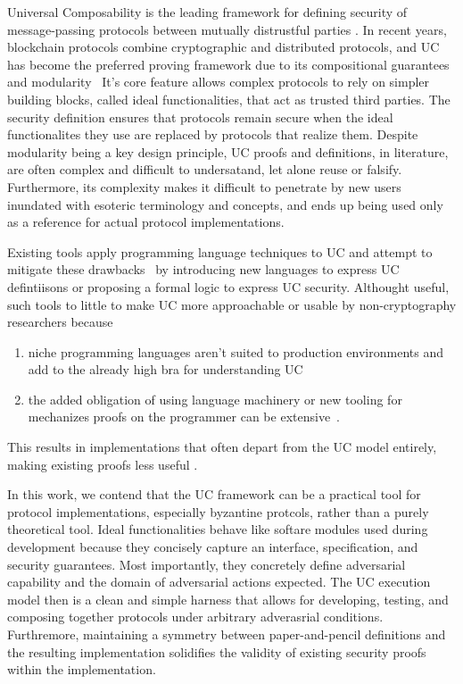 Universal Composability is the leading framework for defining security of message-passing protocols between mutually distrustful parties .
In recent years, blockchain protocols combine cryptographic and distributed protocols, and UC has become the preferred proving framework due to its compositional guarantees and modularity~\cite{blockchain, papers, that, do, this}
It's core feature allows complex protocols to rely on simpler building blocks, called ideal functionalities, that act as trusted third parties. 
The security definition ensures that protocols remain secure when the ideal functionalites they use are replaced by protocols that realize them.
Despite modularity being a key design principle, UC proofs and definitions, in literature, are often complex and difficult to undersatand, let alone reuse or falsify.
Furthermore, its complexity makes it difficult to penetrate by new users inundated with esoteric terminology and concepts, and ends up being used only as a reference for actual protocol implementations.

Existing tools apply programming language techniques to UC and attempt to mitigate these drawbacks~\cite{ipdl,easyuc,somemore} by introducing new languages to express UC defintiisons or proposing a formal logic to express UC security. 
Althought useful, such tools to little to make UC more approachable or usable by non-cryptography researchers because 
\begin{enumerate}
\item niche programming languages aren't suited to production environments and add to the already high bra for understanding UC
\item the added obligation of using language machinery or new tooling for mechanizes proofs on the programmer can be extensive~\cite{ironfleet}.
\end{enumerate}
This results in implementations that often depart from the UC model entirely, making existing proofs less useful .

In this work, we contend that the UC framework can be a practical tool for protocol implementations, especially byzantine protcols, rather than a purely theoretical tool.
Ideal functionalities behave like softare modules used during development because they concisely capture an interface, specification, and security guarantees.
Most importantly, they concretely define adversarial capability and the domain of adversarial actions expected. 
The UC execution model then is a clean and simple harness that allows for developing, testing, and composing together protocols under arbitrary adverasrial conditions.
Furthremore, maintaining a symmetry between paper-and-pencil definitions and the resulting implementation solidifies the validity of existing security proofs within the implementation.

